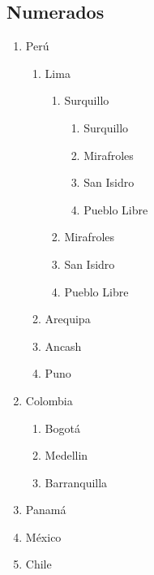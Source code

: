 \documentclass[a4paper, 11pt]{article}
\begin{document}
        \subsection{Numerados}
           \begin{enumerate} %
               \item Perú
                 \begin{enumerate} %
                     \item Lima
                        \begin{enumerate} %
                            \item Surquillo
                               \begin{enumerate} %
                                 \item Surquillo
                                 \item Mirafroles
                                 \item San Isidro
                                 \item Pueblo Libre
                               \end{enumerate}
                            \item Mirafroles
                            \item San Isidro
                            \item Pueblo Libre
                        \end{enumerate}
                     \item Arequipa
                     \item Ancash
                     \item Puno
                 \end{enumerate}
               \item Colombia
                 \begin{enumerate}
                     \item Bogotá
                     \item Medellin
                     \item Barranquilla
                 \end{enumerate}
               \item Panamá
               \item México
               \item Chile
           \end{enumerate}
           
\end{document}
